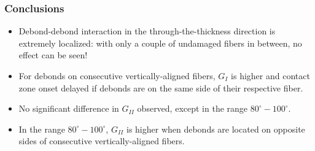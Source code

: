\documentclass[first,firstsupp,lastsupp,last,hyperref,table]{ETHclass}
\begin{document}
\begin{frame}
\frametitle{Conclusions}
\vspace{-0.5cm}
\centering
\begin{itemize}[label=]
\item Debond-debond interaction in the through-the-thickness direction is extremely localized: with only a couple of undamaged fibers in between, no effect can be seen!
\item For debonds on consecutive vertically-aligned fibers, $G_{I}$ is higher and contact zone onset delayed if debonds are on the same side of 
their respective fiber.
\item No  significant  difference  in $G_{II}$ observed, except in the range $80^{\circ}-100^{\circ}$.
\item In the range $80^{\circ}-100^{\circ}$, $G_{II}$ is higher when 
debonds  are  located  on  opposite  sides  of  consecutive  vertically-aligned 
fibers. 
\end{itemize}
\end{frame}

\begin{frame}[plain]
\frametitle{}
\end{frame}
\end{document}
